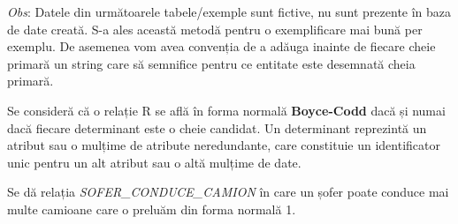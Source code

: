 \documentclass[12pt, a4paper]{article}
\begin{document}
\begin{table}[!htbp]
\begin{center}
\caption{Proiectia \emph{R1-3($X_2$, $X_3$)}}\label{tab11-3}
\end{center}
\end{table}

\newpage
\emph{Obs}: Datele din următoarele tabele/exemple sunt fictive, nu sunt prezente în baza de date creată. S-a ales această metodă pentru o exemplificare mai bună per exemplu. De asemenea vom avea convenția de a adăuga inainte de fiecare cheie primară un string care să semnifice pentru ce entitate este desemnată cheia primară.

Se consideră că o relație R se află în forma normală \textbf{Boyce-Codd} dacă și numai dacă fiecare determinant este o cheie candidat. Un determinant reprezintă un atribut sau o mulțime de atribute neredundante, care constituie un identificator unic pentru un alt atribut sau o altă mulțime de date.

Se dă relația \emph{SOFER\_CONDUCE\_CAMION} în care un șofer poate conduce mai multe camioane care o preluăm din forma normală 1.

\begin{table}[!htbp]
\begin{center}
    \caption{Relatia \emph{SOFER\_CONDUE\_CAMION}}\label{tab12}
\end{center}
\end{table}
\end{document}
